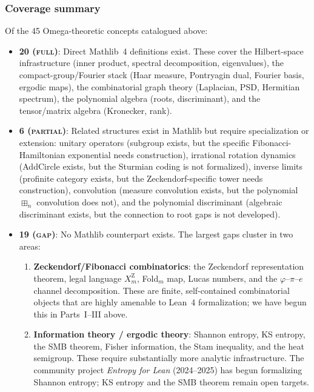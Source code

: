 \subsubsection*{Coverage summary}

Of the 45 Omega-theoretic concepts catalogued above:
\begin{itemize}[nosep]
\item \textbf{20 (\textsc{full})}: Direct Mathlib~4 definitions exist.
  These cover the Hilbert-space infrastructure
  (inner product, spectral decomposition, eigenvalues),
  the compact-group/Fourier stack
  (Haar measure, Pontryagin dual, Fourier basis, ergodic maps),
  the combinatorial graph theory
  (Laplacian, PSD, Hermitian spectrum),
  the polynomial algebra (roots, discriminant),
  and the tensor/matrix algebra (Kronecker, rank).
\item \textbf{6 (\textsc{partial})}: Related structures exist in Mathlib
  but require specialization or extension:
  unitary operators (subgroup exists, but the specific
  Fibonacci-Hamiltonian exponential needs construction),
  irrational rotation dynamics (AddCircle exists, but the
  Sturmian coding is not formalized),
  inverse limits (profinite category exists, but
  the Zeckendorf-specific tower needs construction),
  convolution (measure convolution exists, but the
  polynomial $\boxplus_n$ convolution does not),
  and the polynomial discriminant (algebraic discriminant exists,
  but the connection to root gaps is not developed).
\item \textbf{19 (\textsc{gap})}: No Mathlib counterpart exists.
  The largest gaps cluster in two areas:
  \begin{enumerate}[nosep]
  \item \textbf{Zeckendorf/Fibonacci combinatorics}:
    the Zeckendorf representation theorem,
    legal language $X_m^{\mathrm Z}$, Fold$_m$ map,
    Lucas numbers, and the $\varphi$--$\pi$--$e$ channel
    decomposition.
    These are finite, self-contained combinatorial objects
    that are highly amenable to Lean~4 formalization;
    we have begun this in Parts~I--III above.
  \item \textbf{Information theory / ergodic theory}:
    Shannon entropy, KS entropy, the SMB theorem,
    Fisher information, the Stam inequality,
    and the heat semigroup.
    These require substantially more analytic infrastructure.
    The community project \emph{Entropy for Lean}
    (2024--2025) has begun formalizing Shannon entropy;
    KS entropy and the SMB theorem remain open targets.
  \end{enumerate}
\end{itemize}

